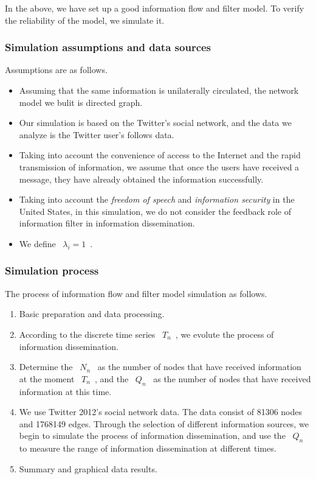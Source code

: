 \documentclass[a4paper,11pt]{article}
\begin{document}
\par In the above, we have set up a good information flow and filter model. To verify the reliability of the model, we simulate it.
\subsubsection{Simulation assumptions and data sources}
\par Assumptions are as follows.
\begin{itemize}
\item Assuming that the same information is unilaterally circulated, the network model we bulit is directed graph.
\item Our simulation is based on the Twitter's social network, and the data we analyze is the Twitter user's follows data\cite{RB}.
\item Taking into account the convenience of access to the Internet and the rapid transmission of information, we assume that once the users have received a message, they have already obtained the information successfully.
\item Taking into account the \emph{freedom of speech} and \emph{information security} in the United States, in this simulation, we do not consider the feedback role of information filter in information dissemination.
\item We define ~$\lambda_i=1$~.
\end{itemize}




\subsubsection{Simulation process}
\par The process of information flow and filter model simulation as follows.
\begin{enumerate}%
\renewcommand{\labelenumi}{(\theenumi)}
    \item Basic preparation and data processing.
    \item According to the discrete time series ~$T_n$~, we evolute the process of information dissemination.
    \item Determine the ~$N_n$~ as the number of nodes that have received information at the moment ~$T_n$~, and the ~$Q_n$~ as the number of nodes that have received information at this time.
    \item We use Twitter 2012's social network data. The data consist of 81306 nodes and 1768149 edges. Through the selection of different information sources, we begin to simulate the process of information dissemination, and use the ~$Q_n$~ to measure the range of information dissemination at different times.
    \item Summary and graphical data results.
\end{enumerate}
\end{document}
